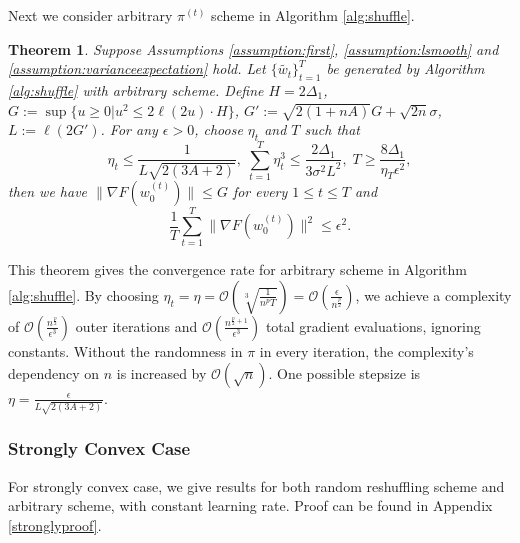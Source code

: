 \documentclass{article} %
\theoremstyle{plain}
\newtheorem{theorem}{Theorem}[section]
\theoremstyle{definition}
\theoremstyle{remark}
\newtheorem{remark}[theorem]{Remark}
\begin{document}
Next we consider arbitrary $\pi^{(t)}$ scheme in Algorithm \ref{alg:shuffle}.

\begin{theorem}
\label{theorem:nonconvexallscheme}
    Suppose Assumptions \ref{assumption:first}, \ref{assumption:lsmooth} and \ref{assumption:varianceexpectation} hold. Let $\{\tilde{w_t}\}_{t=1}^T$ be generated by Algorithm \ref{alg:shuffle} with arbitrary scheme. Define $H=2\Delta_1$, $G:=\sup\{u\geq 0|u^2\leq 2\ell(2u)\cdot H\}$, $G':=\sqrt{2(1+nA)}G+\sqrt{2n}\sigma$, $L:=\ell(2G')$. For any $\epsilon>0$, choose $\eta_t$ and $T$ such that
    $$\eta_t\leq \frac{1}{L\sqrt{2(3A+2)}}, \; \sum_{t=1}^T \eta_t^3 \leq \frac{2\Delta_1}{3\sigma^2L^2}, \; T\geq \frac{8\Delta_1}{\eta_T \epsilon^2},$$ then we have $\|\nabla F(w^{(t)}_0)\|\leq G$ for every $1\leq t\leq T$ and $$\frac{1}{T}\sum_{t=1}^T\|\nabla F(w^{(t)}_0)\|^2\leq \epsilon^2.$$
\end{theorem}

This theorem gives the convergence rate for arbitrary scheme in Algorithm \ref{alg:shuffle}. By choosing $\eta_t = \eta = \mathcal{O}\left(\sqrt[3]{\frac{1}{n^p T}}\right)=\mathcal{O}\left(\frac{\epsilon}{n^\frac{p}{2}}\right)$, we achieve a complexity of $\mathcal{O}\left(\frac{n^{\frac{p}{2}}}{\epsilon^3}\right)$ outer iterations and $\mathcal{O}\left(\frac{n^{\frac{p}{2}+1}}{\epsilon^3}\right)$ total gradient evaluations, ignoring constants. Without the randomness in $\pi$ in every iteration, the complexity's dependency on $n$ is increased by $\mathcal{O}(\sqrt{n})$. One possible stepsize is $\eta=\frac{\epsilon}{L\sqrt{2(3A+2)}}.$


\subsubsection{Strongly Convex Case}
\label{section:strongly}

For strongly convex case, we give results for both random reshuffling scheme and arbitrary scheme, with constant learning rate. Proof can be found in Appendix \ref{stronglyproof}.
\end{document}
